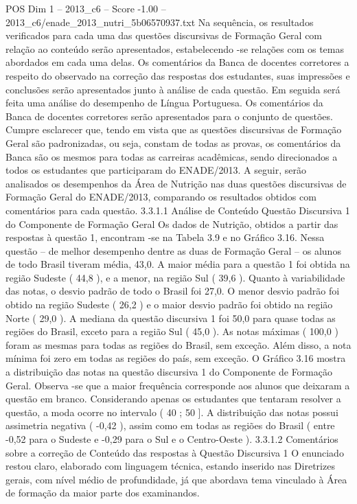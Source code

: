 \begin{textsample}{POS Dim 1 – 2013\_c6 – Score -1.00 – 2013\_c6/enade\_2013\_nutri\_5b06570937.txt}
Na sequência, os resultados verificados para cada uma das questões discursivas de Formação Geral com relação ao conteúdo serão apresentados, estabelecendo -se relações com os temas abordados em cada uma delas.
Os comentários da Banca de docentes corretores a respeito do observado na correção das respostas dos estudantes, suas impressões e conclusões serão apresentados junto à análise de cada questão.
Em seguida será feita uma análise do desempenho de Língua Portuguesa.
Os comentários da Banca de docentes corretores serão apresentados para o conjunto de questões.
Cumpre esclarecer que, tendo em vista que as questões discursivas de Formação Geral são padronizadas, ou seja, constam de todas as provas, os comentários da Banca são os mesmos para todas as carreiras acadêmicas, sendo direcionados a todos os estudantes que participaram do ENADE/2013.
A seguir, serão analisados os desempenhos da Área de Nutrição nas duas questões discursivas de Formação Geral do ENADE/2013, comparando os resultados obtidos com comentários para cada questão. 3.3.1.1 Análise de Conteúdo Questão Discursiva 1 do Componente de Formação Geral Os dados de Nutrição, obtidos a partir das respostas à questão 1, encontram -se na Tabela 3.9 e no Gráfico 3.16.
Nessa questão – de melhor desempenho dentre as duas de Formação Geral – os alunos de todo Brasil tiveram média, 43,0.
A maior média para a questão 1 foi obtida na região Sudeste ( 44,8 ), e a menor, na região Sul ( 39,6 ).
Quanto à variabilidade das notas, o desvio padrão de todo o Brasil foi 27,0.
O menor desvio padrão foi obtido na região Sudeste ( 26,2 ) e o maior desvio padrão foi obtido na região Norte ( 29,0 ).
A mediana da questão discursiva 1 foi 50,0 para quase todas as regiões do Brasil, exceto para a região Sul ( 45,0 ).
As notas máximas ( 100,0 ) foram as mesmas para todas as regiões do Brasil, sem exceção.
Além disso, a nota mínima foi zero em todas as regiões do país, sem exceção.
O Gráfico 3.16 mostra a distribuição das notas na questão discursiva 1 do Componente de Formação Geral.
Observa -se que a maior frequência corresponde aos alunos que deixaram a questão em branco.
Considerando apenas os estudantes que tentaram resolver a questão, a moda ocorre no intervalo ( 40 ; 50 ].
A distribuição das notas possui assimetria negativa ( -0,42 ), assim como em todas as regiões do Brasil ( entre -0,52 para o Sudeste e -0,29 para o Sul e o Centro-Oeste ). 3.3.1.2 Comentários sobre a correção de Conteúdo das respostas à Questão Discursiva 1 O enunciado restou claro, elaborado com linguagem técnica, estando inserido nas Diretrizes gerais, com nível médio de profundidade, já que abordava tema vinculado à Área de formação da maior parte dos examinandos.

\end{textsample}
